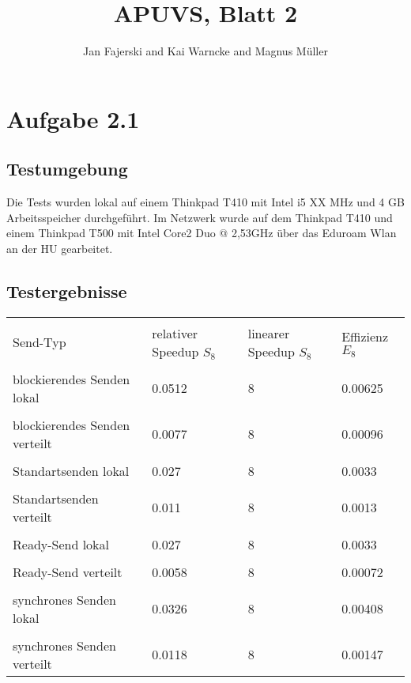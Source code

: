 \documentclass[a4paper,
12pt,
BCOR12mm,
]{scrartcl}
\title{APUVS, Blatt 2}
\author{Jan Fajerski and Kai Warncke and Magnus Müller}
\begin{document}
\maketitle  

\section*{Aufgabe 2.1}
  \subsection*{Testumgebung}
    Die Tests wurden lokal auf einem Thinkpad T410 mit Intel i5 XX MHz und 4 GB Arbeitsspeicher durchgeführt.
    Im Netzwerk wurde auf dem Thinkpad T410 und einem Thinkpad T500 mit Intel Core2 Duo @ 2,53GHz über das Eduroam Wlan
    an der HU gearbeitet.

  \subsection*{Testergebnisse}
    \begin{tabular}{|p{3cm}|p{3cm}|p{3cm}|p{3cm}|}
      \hline &&&\\
      Send-Typ                      & relativer Speedup $S_8$       & linearer Speedup  $S_8$       & Effizienz $E_8$   \\
      \hline &&&\\
      blockierendes Senden lokal    & 0.0512                        & 8                             & 0.00625           \\
      \hline &&&\\
      blockierendes Senden verteilt & 0.0077                        & 8                             & 0.00096           \\
      \hline &&&\\
      Standartsenden lokal          & 0.027                         & 8                             & 0.0033            \\
      \hline &&&\\
      Standartsenden verteilt       & 0.011                         & 8                             & 0.0013            \\
      \hline &&&\\
      Ready-Send lokal              & 0.027                         & 8                             & 0.0033            \\
      \hline &&&\\
      Ready-Send verteilt           & 0.0058                        & 8                             & 0.00072           \\
      \hline &&&\\
      synchrones Senden lokal       & 0.0326                        & 8                             & 0.00408           \\
      \hline &&&\\
      synchrones Senden verteilt    & 0.0118                        & 8                             & 0.00147           \\
      \hline 
    \end{tabular}
\end{document}

